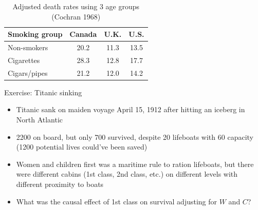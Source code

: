 \documentclass{beamer}
\begin{document}
\begin{frame}[plain]

	\begin{table}\centering
	\caption{Adjusted death rates using 3 age groups (Cochran 1968)}
		\begin{center}
		\begin{tabular}{lccc}
		\hline \hline
		\multicolumn{1}{l}{Smoking group}&
		\multicolumn{1}{c}{Canada}&
		\multicolumn{1}{c}{U.K.}&
		\multicolumn{1}{c}{U.S.}\\
		\hline
		Non-smokers & 20.2 & 11.3 & 13.5 \\
		Cigarettes & 28.3 & 12.8  &  17.7 \\
		Cigars/pipes & 21.2 & 12.0 & 14.2 \\
		\hline
		\end{tabular}
		\end{center}
	\end{table}

\end{frame}

\begin{frame}{Exercise: Titanic sinking}

\begin{itemize}

\item Titanic sank on maiden voyage April 15, 1912 after hitting an iceberg in North Atlantic
\item 2200 on board, but only 700 survived, despite 20 lifeboats with 60 capacity (1200 potential lives could've been saved)
\item Women and children first was a maritime rule to ration lifeboats, but there were different cabins (1st class, 2nd class, etc.) on different levels with different proximity to boats
\item What was the causal effect of 1st class on survival adjusting for $W$ and $C$?
\end{itemize}

\end{frame}
\end{document}
